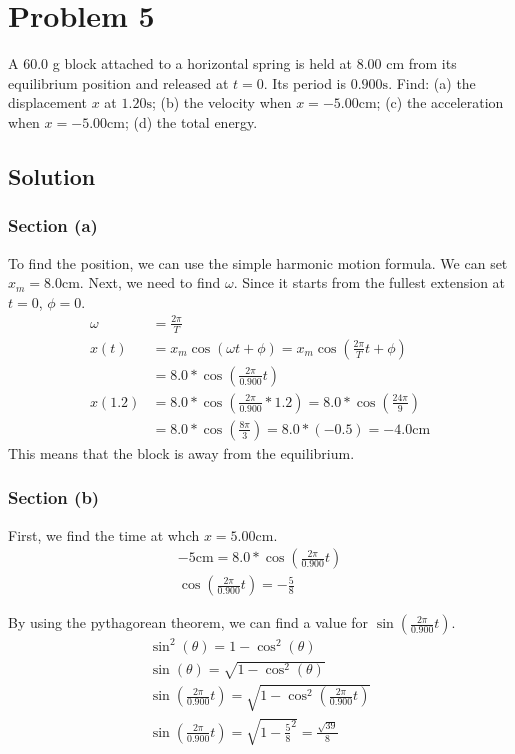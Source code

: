 \documentclass[12pt]{article}
\begin{document}
\pagebreak
\section{Problem 5}
A 60.0 g block attached to a horizontal spring is held at 8.00 cm from its equilibrium position and released at $t = 0$. Its period is $0.900 \unit{\second}$. Find: (a) the displacement $x$ at $1.20 \unit{\second}$; (b) the velocity when $x = -5.00 \unit{\centi\meter}$; (c) the acceleration when $x = -5.00 \unit{\centi\meter}$; (d) the total energy.

\subsection{Solution}
\subsubsection{Section (a)}
To find the position, we can use the simple harmonic motion formula. We can set $x_m = 8.0\unit{\centi\meter}$. Next, we need to find $\omega$. Since it starts from the fullest extension at $t = 0$, $\phi = 0$.
\begin{align}
    \omega  &=  \frac{2\pi}{T}\\
    x(t)    &=  x_m \cos(\omega t + \phi)
        =   x_m \cos\left( \frac{2\pi}{T}t + \phi \right)\\
        &=  8.0 * \cos\left( \frac{2\pi}{0.900}t \right)\\
    x(1.2)  &=  8.0 * \cos\left( \frac{2\pi}{0.900}*1.2 \right)
        =   8.0 * \cos\left( \frac{24\pi}{9} \right)\\
        &=  8.0 * \cos\left( \frac{8\pi}{3} \right)
        =   8.0 * (-0.5)
        =   -4.0\unit{\centi\meter}
\end{align}
This means that the block is \boxed{4 \unit{\centi\meter}} away from the equilibrium.

\subsubsection{Section (b)}
First, we find the time at whch $x = 5.00\unit{\centi\meter}$.
\begin{gather}
    -5\unit{\centi\meter}   =   8.0 * \cos\left( \frac{2\pi}{0.900}t \right)\\
    \cos\left(\frac{2\pi}{0.900}t\right) =   -\frac{5}{8}
\end{gather}

By using the pythagorean theorem, we can find a value for $\sin\left(\frac{2\pi}{0.900}t\right)$.
\begin{gather}
    \sin^2(\theta)  =   1 - \cos^2(\theta)\\
    \sin(\theta)    =   \sqrt{1 - \cos^2(\theta)}\\
    \sin\left(\frac{2\pi}{0.900}t\right)    =   \sqrt{1 - \cos^2\left(\frac{2\pi}{0.900}t\right)}\\
    \sin\left(\frac{2\pi}{0.900}t\right)    =   \sqrt{1 - \frac{5}{8}^2} = \frac{\sqrt{39}}{8}
\end{gather}
\end{document}
